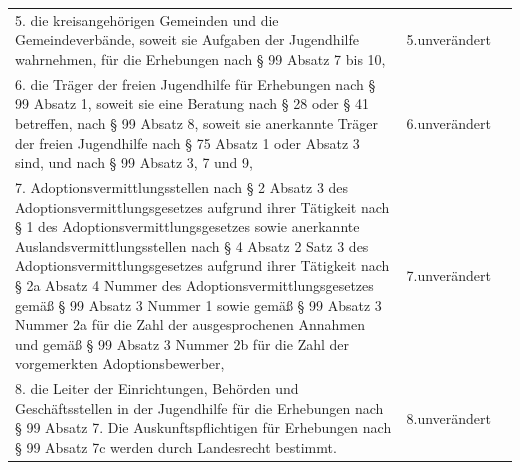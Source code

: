 \documentclass[10pt,a4paper,landscape]{article}
\begin{document}
\begin{longtable}{|L{8.2cm}|L{8.2cm}|L{8.2cm}|}
\hhline{|---|}
5.   \newline die kreisangehörigen Gemeinden und die  \newline Gemeindeverbände, soweit sie Aufgaben  \newline der Jugendhilfe wahrnehmen, für die  \newline Erhebungen nach \S{} 99 Absatz 7 bis 10, & 5.unverändert &  \\
\hhline{|---|}
6.   \newline die Träger der freien Jugendhilfe für  \newline Erhebungen nach \S{} 99 Absatz 1, soweit sie  \newline eine Beratung nach \S{} 28 oder \S{} 41  \newline betreffen, nach \S{} 99 Absatz 8, soweit sie  \newline anerkannte Träger der freien Jugendhilfe  \newline nach \S{} 75 Absatz 1 oder Absatz 3 sind,  \newline und nach \S{} 99 Absatz 3, 7 und 9, & 6.unverändert &  \\
\hhline{|---|}
7.   \newline Adoptionsvermittlungsstellen nach \S{} 2  \newline Absatz 3 des   \newline Adoptionsvermittlungsgesetzes aufgrund  \newline ihrer Tätigkeit nach \S{} 1 des  \newline Adoptionsvermittlungsgesetzes sowie  \newline anerkannte Auslandsvermittlungsstellen  \newline nach \S{} 4 Absatz 2 Satz 3 des  \newline Adoptionsvermittlungsgesetzes aufgrund  \newline ihrer Tätigkeit nach \S{} 2a Absatz 4 Nummer   des Adoptionsvermittlungsgesetzes  \newline gemäß \S{} 99 Absatz 3 Nummer 1 sowie  \newline gemäß \S{} 99 Absatz 3 Nummer 2a für die  \newline Zahl der ausgesprochenen Annahmen und  \newline gemäß \S{} 99 Absatz 3 Nummer 2b für die  \newline Zahl der vorgemerkten Adoptionsbewerber, & 7.unverändert &  \\
\hhline{|---|}
8.   \newline die Leiter der Einrichtungen, Behörden und  \newline Geschäftsstellen in der Jugendhilfe für die  \newline Erhebungen nach \S{} 99 Absatz 7. Die  \newline Auskunftspflichtigen für Erhebungen nach  \newline \S{} 99 Absatz 7c werden durch Landesrecht  \newline bestimmt. & 8.unverändert &  \\

\end{longtable}
\end{document}
